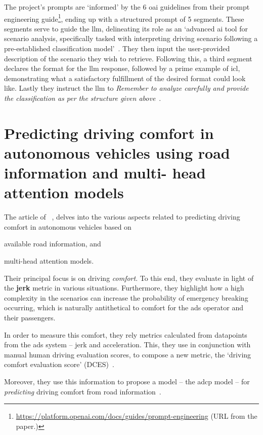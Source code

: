 The project's prompts are `informed' by the \num{6} \acrlong{oai} guidelines from their prompt
engineering guide\footnote{\url{https://platform.openai.com/docs/guides/prompt-engineering} (URL
  from the paper.)}, ending up with a structured prompt of \num{5} segments. These segments serve to
guide the \acrshort{llm}, delineating its role as an `advanced \acrshort{ai} tool for scenario
analysis, specifically tasked with interpreting driving scenario following a pre-established
classification model'~\cite[562]{chat2Scenario}. They then input the user-provided description of
the scenario they wish to retrieve. Following this, a third segment declares the format for the
\acrshort{llm} response, followed by a prime example of \acrlong{icl}, demonstrating what a
satisfactory fulfillment of the desired format could look like. Lastly they instruct the
\acrshort{llm} to \textit{Remember to analyze carefully and provide the classification as per the
  structure given above}~\cite[563]{chat2Scenario}.

\section{Predicting driving comfort in autonomous vehicles using road information and multi- head
  attention models}

The \citeyear{Chen2025} article of \citeauthor{Chen2025}~\cite{Chen2025}, delves into the various
aspects related to predicting driving comfort in autonomous vehicles based on \begin{inparaenum}
  \item available road information, and
  \item multi-head attention models.
\end{inparaenum}
Their principal focus is on driving \emph{comfort}. To this end, they evaluate  in
light of the \textbf{jerk} metric in various situations. Furthermore, they highlight how a high
complexity in the scenarios can increase the probability of emergency breaking occurring, which is
naturally antithetical to comfort for the \acrshort{ads} operator and their passengers.

In order to measure this comfort, they rely metrics calculated from datapoints from the
\acrshort{ads} system -- jerk and acceleration. This, they use in conjunction with manual human
driving evaluation scores, to compose a new metric, the `driving comfort evaluation score'
(DCES)~\cite[10]{Chen2025}.

Moreover, they use this information to propose a model -- the \acrfull{adcp} model -- for
\emph{predicting} driving comfort from road information~\cite[2]{Chen2025}.